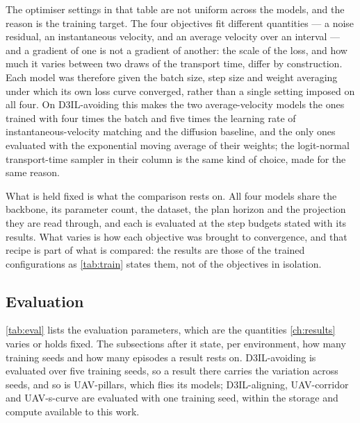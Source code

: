 The optimiser settings in that table are not uniform across the models, and the reason is the training
target. The four objectives fit different quantities --- a noise residual, an instantaneous velocity, and
an average velocity over an interval --- and a gradient of one is not a gradient of another: the scale of
the loss, and how much it varies between two draws of the transport time, differ by construction. Each
model was therefore given the batch size, step size and weight averaging under which its own loss curve
converged, rather than a single setting imposed on all four. On D3IL-avoiding this makes the two
average-velocity models the ones trained with four times the batch and five times the learning rate of
instantaneous-velocity matching and the diffusion baseline, and the only ones evaluated with the
exponential moving average of their weights; the logit-normal transport-time sampler in their column is
the same kind of choice, made for the same reason.

What is held fixed is what the comparison rests on. All four models share the backbone, its parameter
count, the dataset, the plan horizon and the projection they are read through, and each is evaluated at
the step budgets stated with its results. What varies is how each objective was brought to convergence,
and that recipe is part of what is compared: the results are those of the trained configurations as
\autoref{tab:train} states them, not of the objectives in isolation.

\subsection{Evaluation}\label{sec:setup:protocol:eval}

\autoref{tab:eval} lists the evaluation parameters, which are the quantities \autoref{ch:results} varies or
holds fixed. The subsections after it state, per environment, how many training seeds and how many episodes
a result rests on. D3IL-avoiding is evaluated over five training seeds, so a result there carries the variation across seeds,
and so is UAV-pillars, which flies its models; D3IL-aligning, UAV-corridor and UAV-s-curve are evaluated
with one training seed, within the storage and compute available to this work.

